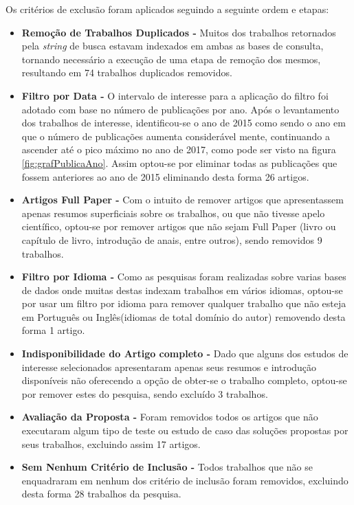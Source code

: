 \documentclass[tid,table]{texufpel} %
\begin{document}
Os critérios de exclusão foram aplicados seguindo a seguinte ordem e etapas:

\begin{itemize}
	\item  \textbf{Remoção de Trabalhos Duplicados - } Muitos dos trabalhos retornados pela \textit{string} de busca estavam indexados em ambas as bases de consulta, tornando necessário a execução de uma etapa de remoção dos mesmos, resultando em 74 trabalhos duplicados removidos.
	
	\item  \textbf{Filtro por Data - } O intervalo de interesse para a aplicação do filtro foi adotado com base no número de publicações por ano. Após o levantamento dos trabalhos de interesse, identificou-se o ano de 2015 como sendo o ano em que o número de publicações aumenta considerável mente, continuando a ascender até o pico máximo no ano de 2017, como pode ser visto na figura \ref{fig:grafPublicaAno}. Assim optou-se por eliminar todas as publicações que fossem anteriores ao ano de 2015 eliminando desta forma 26 artigos.	
	
	\item  \textbf{Artigos Full Paper - } Com o intuito de remover artigos que apresentassem apenas resumos superficiais sobre os trabalhos, ou que não tivesse apelo científico, optou-se por remover artigos que não sejam Full Paper (livro ou capítulo de livro, introdução de anais, entre outros), sendo removidos 9 trabalhos.
	
	\item  \textbf{Filtro por Idioma - } Como as pesquisas foram realizadas sobre varias bases de dados onde muitas destas indexam trabalhos em vários idiomas, optou-se por usar um filtro por idioma para remover qualquer trabalho que não esteja em Português ou Inglês(idiomas de total domínio do autor) removendo desta forma 1 artigo.
	
	\item  \textbf{Indisponibilidade do Artigo completo - } Dado que alguns dos estudos de interesse selecionados apresentaram apenas seus resumos e introdução disponíveis não oferecendo a opção de obter-se o trabalho completo, optou-se por remover estes do pesquisa, sendo excluído 3 trabalhos.
	
	\item  \textbf{Avaliação da Proposta - } Foram removidos todos os artigos que não executaram algum tipo de teste ou estudo de caso das soluções propostas por seus trabalhos, excluindo assim 17 artigos.
	
	\item  \textbf{Sem Nenhum Critério de Inclusão - } Todos trabalhos que não  se enquadraram em nenhum dos critério de inclusão foram removidos, excluindo desta forma 28 trabalhos da pesquisa.	

\end{itemize}
\end{document}
